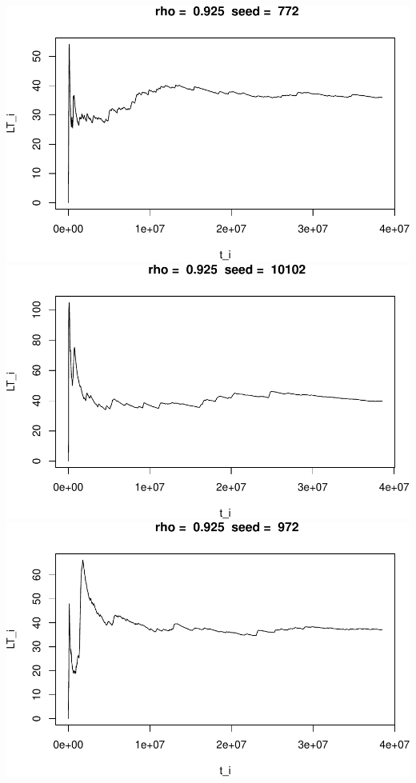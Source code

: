 \documentclass[]{article}
\begin{document}
\includegraphics{003_files/figure-latex/unnamed-chunk-22-1.pdf}
\includegraphics{003_files/figure-latex/unnamed-chunk-22-2.pdf}
\includegraphics{003_files/figure-latex/unnamed-chunk-22-3.pdf}
\end{document}
